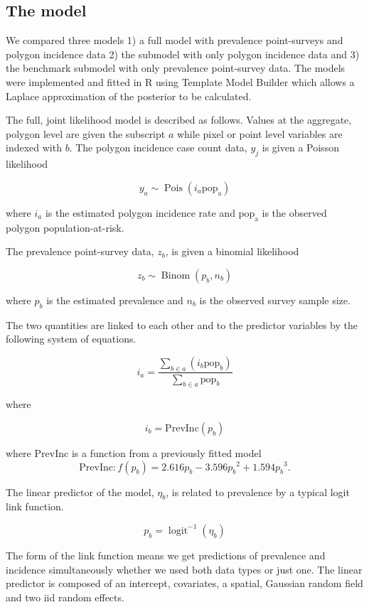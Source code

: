 \documentclass[10pt,letterpaper]{article}
\begin{document}
\subsection*{The model}

We compared three models 1) a full model with prevalence point-surveys and polygon incidence data 2) the submodel with only polygon incidence data and 3) the benchmark submodel with only prevalence point-survey data. 
The models were implemented and fitted in R \cite{R} using Template Model Builder \cite{TMB} which allows a Laplace approximation of the posterior to be calculated.

The full, joint likelihood model is described as follows. 
Values at the aggregate, polygon level are given the subscript $a$ while pixel or point level variables are indexed with $b$.
The polygon incidence case count data, $y_j$ is given a Poisson likelihood

$$y_a \sim \operatorname{Pois}(i_a\mathrm{pop_a})$$

where $i_a$ is the estimated polygon incidence rate and $\mathrm{pop_a}$ is the observed polygon population-at-risk.

The prevalence point-survey data, $z_b$, is given a binomial likelihood

$$z_b \sim \operatorname{Binom}(p_b, n_b) $$

where $p_b$ is the estimated prevalence and $n_b$ is the observed survey sample size. 

The two quantities are linked to each other and to the predictor variables by the following system of equations.

$$i_a = \frac{ \sum_{b \in a}(i_b \mathrm{pop}_b)}{\sum_{b \in a}\mathrm{pop}_b} $$

where

$$i_b = \mathrm{PrevInc}(p_b)$$

where $\mathrm{PrevInc}$ is a function from a previously fitted model \cite{cameron2015defining} 
$$\mathrm{PrevInc}: f\left(p_b\right) = 2.616p_b - 3.596{p_b}^2 + 1.594{p_b}^3.$$

The linear predictor of the model, $\eta_b$, is related to prevalence by a typical logit link function.

$$p_b = \operatorname{logit}^{-1}(\eta_b)$$


The form of the link function means we get predictions of prevalence and incidence simultaneously whether we used both data types or just one.
The linear predictor is composed of an intercept, covariates, a spatial, Gaussian random field and two iid random effects.
\end{document}
